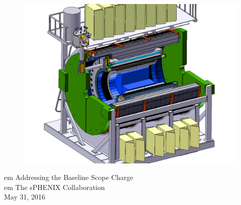 \renewcommand*\familydefault{\sfdefault}
{\sffamily
\vfill
\vspace{4cm}
\begin{figure}[H]
  \begin{center}
    \includegraphics[width=\linewidth]{figs/sPHENIX}
  \end{center}
\end{figure}

\begin{center}
  \LARGE
   em
  Addressing the Baseline Scope Charge\\
   em
  The sPHENIX Collaboration \\
  May 31, 2016 \\
\end{center}

\vspace{2cm}

\begin{figure}[H]
  \begin{center}
  \end{center}
\end{figure}
}


\vfill
\renewcommand*\familydefault{\rmdefault}
